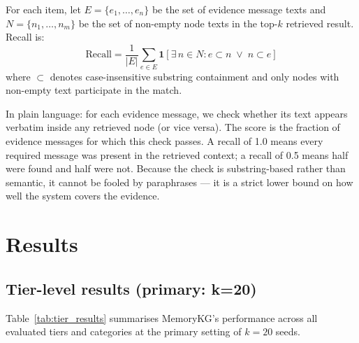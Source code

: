 \documentclass[11pt,a4paper]{article}
\begin{document}
For each item, let $E = \{e_1, \ldots, e_n\}$ be the set of evidence message texts and
$N = \{n_1, \ldots, n_m\}$ be the set of non-empty node texts in the top-$k$ retrieved result.
Recall is:
\[
  \text{Recall} = \frac{1}{|E|}
    \sum_{e \in E} \mathbf{1}\!\left[\exists\, n \in N :
      e \subset n \;\vee\; n \subset e
    \right]
\]
where $\subset$ denotes case-insensitive substring containment and only nodes with
non-empty text participate in the match.

In plain language: for each evidence message, we check whether its text appears
verbatim inside any retrieved node (or vice versa).
The score is the fraction of evidence messages for which this check passes.
A recall of 1.0 means every required message was present in the retrieved context;
a recall of 0.5 means half were found and half were not.
Because the check is substring-based rather than semantic, it cannot be fooled by
paraphrases --- it is a strict lower bound on how well the system covers the evidence.

\section{Results}
\label{sec:results}

\subsection{Tier-level results (primary: k=20)}

Table~\ref{tab:tier_results} summarises MemoryKG's performance across all evaluated
tiers and categories at the primary setting of $k{=}20$ seeds.
\end{document}
